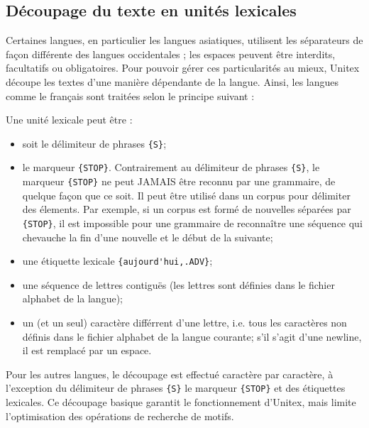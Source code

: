 \subsection{Découpage du texte en unités lexicales}
\label{tokenization}
Certaines langues, en particulier les langues asiatiques, utilisent les séparateurs de façon
différente des langues occidentales ; les espaces peuvent être interdits, facultatifs ou
obligatoires. Pour pouvoir gérer ces particularités au mieux, Unitex découpe les textes d’une
manière dépendante de la langue. Ainsi, les langues comme le français sont traitées selon le
principe suivant :

\bigskip
\noindent Une unité lexicale peut être :
\begin{itemize}
  \item soit le délimiteur de phrases \verb+{S}+;
  \item le marqueur \verb+{STOP}+. Contrairement au délimiteur de phrases
  \verb+{S}+, le marqueur \verb+{STOP}+ ne peut JAMAIS être reconnu par une grammaire, de quelque
  façon que ce soit. Il peut être utilisé dans un corpus pour délimiter des élements. Par exemple,
  si un corpus est formé de nouvelles séparées par \verb+{STOP}+, il est impossible pour une
  grammaire de reconnaître une séquence qui chevauche la fin d'une nouvelle et le début de la
  suivante;
  \item une étiquette lexicale \verb+{aujourd'hui,.ADV}+;
  \item une séquence de lettres contiguës (les lettres sont définies dans le fichier alphabet de la
  langue);
  \item un (et un seul) caractère différrent d'une lettre, i.e. tous les caractères non définis
  dans le fichier alphabet de la langue courante; s'il s'agit d'une newline, il est remplacé par un
  espace.
\end{itemize}

\bigskip
\noindent Pour les autres langues, le découpage est effectué caractère par caractère, à l’exception
du délimiteur de phrases \verb+{S}+ le marqueur \verb+{STOP}+ et des étiquettes lexicales. Ce
découpage basique garantit le fonctionnement d’Unitex, mais limite l’optimisation des opérations de
recherche de motifs.


